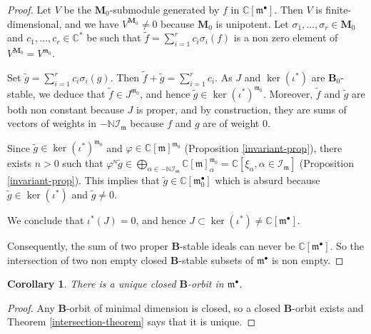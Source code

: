 \documentclass[10pt,a4paper]{amsart}
\newcommand{\soc}[1]{\mathcal{I}_{#1}}
\newcommand{\group}[1]{\mathbf{#1}}
\numberwithin{equation}{section}
\theoremstyle{plain}
\newtheorem{corollary}[theorem]{Corollary}
\theoremstyle{definition}
\theoremstyle{remark}
\begin{document}
\begin{proof}
Let $V$ be the $\group{M}_{0}$-submodule generated by $f$ in $\mathbb{C}[\mathfrak{m}^{\bullet} ]$. 
Then $V$ is finite-dimensional, and we have $V^{\group{M}_{0}}\neq 0$ because $\group{M}_{0}$ is unipotent. 
Let $\sigma_{1},\dots ,\sigma_{r}\in \group{M}_{0}$ and $c_{1},\dots ,c_{r}\in \mathbb{C}^{*}$
be such that 
$\tilde{f} = \sum_{i=1}^{r} c_{i}\sigma_{i}( f )$ is a non zero element of $V^{\group{M}_{0}}= V^{\mathfrak{m}_{0}}$.

Set $\tilde{g} = \sum_{i=1}^{r} c_{i}\sigma_{i}( g)$. Then $\tilde{f} + \tilde{g} = \sum_{i=1}^{r} c_{i}$.
As $J$ and $\ker (\iota^{*})$ are $\group{B}_{0}$-stable, we deduce that $\tilde{f} \in J^{\mathfrak{m}_{0}}$, and 
hence $\tilde{g}\in \ker (\iota^{*})^{\mathfrak{m}_{0}}$. Moreover,  $\tilde{f}$ and $\tilde{g}$ are both non constant
because $J$ is proper, and by construction, they are sums of vectors of weights
in $-\mathbb{N}\soc{\mathfrak{m}}$ because $f$ and $g$ are of weight $0$. 

Since $\tilde{g}\in \ker (\iota^{*})^{\mathfrak{m}_{0}}$ and 
$\varphi \in \mathbb{C}[\mathfrak{m}]^{\mathfrak{m}_{0}}$
(Proposition \ref{invariant-prop}), there exists $n>0$ such that $\varphi^{n}\tilde{g}\in 
\bigoplus_{\alpha\in -\mathbb{N}\soc{\mathfrak{m}}} \mathbb{C}[\mathfrak{m}]_{\alpha}^{\mathfrak{m}_{0}}
=\mathbb{C}[\xi_{\alpha} , \alpha\in \soc{\mathfrak{m}}]$ (Proposition \ref{invariant-prop}). 
This implies that $\tilde{g}\in \mathbb{C}[\mathfrak{m}_{0}^{\bullet}]$ which is absurd because $\tilde{g}\in
\ker (\iota^{*})$ and $\tilde{g}\neq 0$. 

We conclude that $\iota^{*}( J) = 0$, and hence $J \subset \ker (\iota^{*}) \neq \mathbb{C}[\mathfrak{m}^{\bullet}]$.

Consequently, the sum of two proper $\group{B}$-stable ideals can never be $\mathbb{C}[\mathfrak{m}^{\bullet}]$.
So the intersection of two non empty closed $\group{B}$-stable subsets of $\mathfrak{m}^{\bullet}$ is 
non empty.
\end{proof}

\begin{corollary}\label{main-corollary}
There is a unique closed $\group{B}$-orbit in $\mathfrak{m}^{\bullet}$.
\end{corollary}
\begin{proof}
Any $\group{B}$-orbit of minimal dimension is closed, so a closed $\group{B}$-orbit exists and
Theorem \ref{intersection-theorem} says that it is unique. 
\end{proof}
\end{document}
